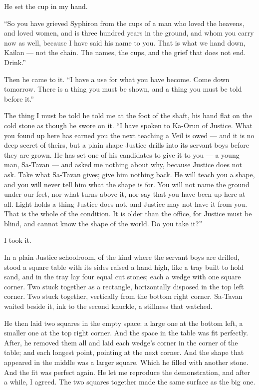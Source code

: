 He set the cup in my hand.\par

``So you have grieved Syphiron from the cups of a man who loved the heavens, and loved women, and is three hundred years in the ground, and whom you carry now as well, because I have said his name to you. That is what we hand down, Kailan --- not the chain. The names, the cups, and the grief that does not end. Drink.''\par

Then he came to it. ``I have a use for what you have become. Come down tomorrow. There is a thing you must be shown, and a thing you must be told before it.''\par

The thing I must be told he told me at the foot of the shaft, his hand flat on the cold stone as though he swore on it. ``I have spoken to Ka-Orun of Justice. What you found up here has earned you the next teaching a Veil is owed --- and it is no deep secret of theirs, but a plain shape Justice drills into its servant boys before they are grown. He has set one of his candidates to give it to you --- a young man, Sa-Tavan --- and asked me nothing about why, because Justice does not ask. Take what Sa-Tavan gives; give him nothing back. He will teach you a shape, and you will never tell him what the shape is for. You will not name the ground under our feet, nor what turns above it, nor say that you have been up here at all. Light holds a thing Justice does not, and Justice may not have it from you. That is the whole of the condition. It is older than the office, for Justice must be blind, and cannot know the shape of the world. Do you take it?''\par

I took it.\par

In a plain Justice schoolroom, of the kind where the servant boys are drilled, stood a square table with its sides raised a hand high, like a tray built to hold sand, and in the tray lay four equal cut stones; each a wedge with one square corner. Two stuck together as a rectangle, horizontally disposed in the top left corner. Two stuck together, vertically from the bottom right corner. Sa-Tavan waited beside it, ink to the second knuckle, a stillness that watched. \par

He then laid two squares in the empty space: a large one at the bottom left, a smaller one at the top right corner. And the space in the table was fit perfectly. After, he removed them all and laid each wedge's corner in the corner of the table; and each longest point, pointing at the next corner. And the shape that appeared in the middle was a larger square. Which he filled with another stone. And the fit was perfect again. He let me reproduce the demonstration, and after a while, I agreed. The two squares together made the same surface as the big one.

